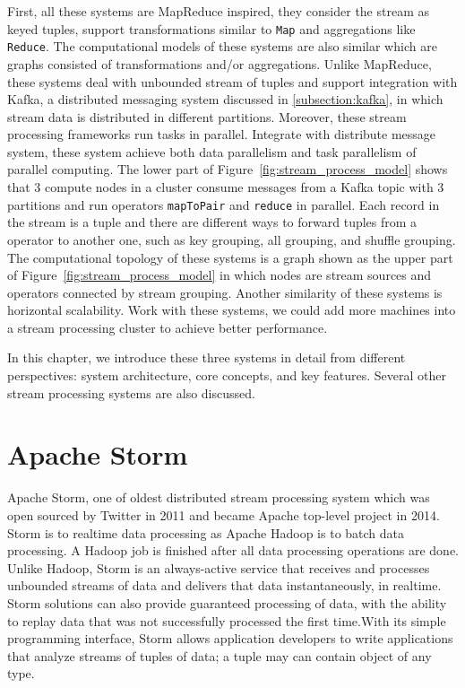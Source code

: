 First, all these systems are MapReduce inspired, they consider the stream as keyed tuples, support transformations similar to \texttt{Map} and aggregations like \texttt{Reduce}. The computational models of these systems are also similar which are graphs consisted of transformations and/or aggregations. Unlike MapReduce, these systems deal with unbounded stream of tuples and support integration with Kafka, a distributed messaging system discussed in \cref{subsection:kafka}, in which stream data is distributed in different partitions. Moreover, these stream processing frameworks run tasks in parallel. Integrate with distribute message system, these system achieve both data parallelism and task parallelism of parallel computing. The lower part of Figure~\ref{fig:stream_process_model} shows that 3 compute nodes in a cluster consume messages from a Kafka topic with 3 partitions and run operators \texttt{mapToPair} and \texttt{reduce} in parallel. Each record in the stream is a tuple and there are different ways to forward tuples from a operator to another one, such as key grouping, all grouping, and shuffle grouping.  The computational topology of these systems is a graph shown as the upper part of Figure~\ref{fig:stream_process_model} in which nodes are stream sources and operators connected by stream grouping. Another similarity of these systems is horizontal scalability. Work with these systems, we could add more machines into a stream processing cluster to achieve better performance.


In this chapter, we introduce these three systems in detail from different perspectives: system architecture, core concepts, and key features. Several other stream processing systems are also discussed. 
 
\section{Apache Storm}
Apache Storm, one of oldest distributed stream processing system which was open sourced by Twitter in 2011 and became Apache top-level project in 2014.  Storm is to realtime data processing as Apache Hadoop is to batch data processing. A Hadoop job is finished after all data processing operations are done. Unlike Hadoop, Storm is an always-active service that receives and processes unbounded streams of data and delivers that data instantaneously, in realtime. Storm solutions can also provide guaranteed processing of data, with the ability to replay data that was not successfully processed the first time.With its simple programming interface, Storm allows application developers to write applications that analyze streams of tuples of data; a tuple may can contain object of any type.

